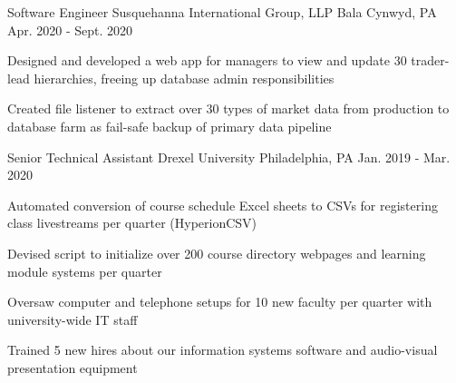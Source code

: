 

\begin{cventries}

  \cventry
  {Software Engineer} %
  {Susquehanna International Group, LLP} %
  {Bala Cynwyd, PA} %
  {Apr. 2020 - Sept. 2020} %
  {
    \begin{cvitems} %
      \item {Designed and developed a web app for managers to view and update 30 trader-lead hierarchies, freeing up database admin responsibilities}
      \item {Created file listener to extract over 30 types of market data from production to database farm as fail-safe backup of primary data pipeline}
    \end{cvitems}
  }

  \cventry
  {Senior Technical Assistant} %
  {Drexel University} %
  {Philadelphia, PA} %
  {Jan. 2019 - Mar. 2020} %
  {
    \begin{cvitems} %
      \item {Automated conversion of course schedule Excel sheets to CSVs for registering class livestreams per quarter (HyperionCSV)}
      \item {Devised script to initialize over 200 course directory webpages and learning module systems per quarter}
      \item {Oversaw computer and telephone setups for 10 new faculty per quarter with university-wide IT staff}
      \item {Trained 5 new hires about our information systems software and audio-visual presentation equipment}
    \end{cvitems}
  }

\end{cventries}

